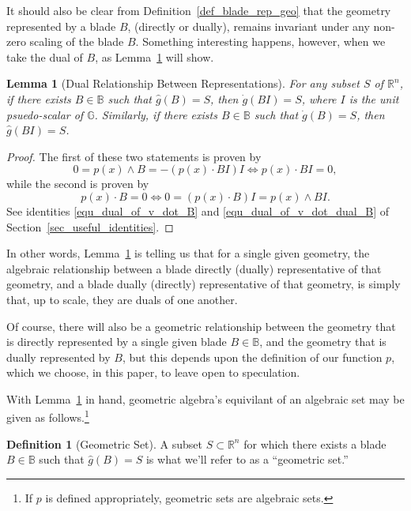 \documentclass{birkjour}
\newtheorem{lem}[thm]{Lemma}
\theoremstyle{definition}
\newtheorem{defn}[thm]{Definition}
\theoremstyle{remark}
\numberwithin{equation}{section}
\newcommand{\R}{\mathbb{R}}
\newcommand{\B}{\mathbb{B}}
\newcommand{\G}{\mathbb{G}}
\newcommand{\gd}{\dot{g}}
\newcommand{\gh}{\hat{g}}
\begin{document}
It should also be clear from Definition~\ref{def_blade_rep_geo} that the geometry represented by a blade $B$, (directly or dually), remains invariant
under any non-zero scaling of the blade $B$.  Something interesting happens, however, when we take the dual of $B$, as Lemma~\ref{lem_dual_rep} will show.

\begin{lem}[Dual Relationship Between Representations]\label{lem_dual_rep}
For any subset $S$ of $\R^n$, if there exists $B\in\B$ such that $\gh(B)=S$, then $\gd(BI)=S$, where
$I$ is the unit psuedo-scalar of $\G$.  Similarly, if there exists $B\in\B$ such that $\gd(B)=S$, then $\gh(BI)=S$.
\end{lem}
\begin{proof}
The first of these two statements is proven by
\begin{equation*}
0=p(x)\wedge B=-(p(x)\cdot BI)I\iff p(x)\cdot BI=0,
\end{equation*}
while the second is proven by
\begin{equation*}
p(x)\cdot B=0\iff 0=(p(x)\cdot B)I=p(x)\wedge BI.
\end{equation*}
See identities \eqref{equ_dual_of_v_dot_B} and \eqref{equ_dual_of_v_dot_dual_B} of Section~\ref{sec_useful_identities}.
\end{proof}

In other words, Lemma~\ref{lem_dual_rep} is telling us that for a single given geometry, the algebraic relationship between a
blade directly (dually) representative of that geometry, and a blade dually (directly) representative of that geometry, is simply
that, up to scale, they are duals of one another.

Of course, there will also be a geometric relationship between the geometry that is directly represented by a single given
blade $B\in\B$, and the geometry that is dually represented by $B$, but this depends upon the definition of our function
$p$, which we choose, in this paper, to leave open to speculation.

With Lemma~\ref{lem_dual_rep} in hand, geometric algebra's equivilant of an algebraic set may be given as follows.\footnote{If $p$ is
defined appropriately, geometric sets are algebraic sets.}

\begin{defn}[Geometric Set]\label{def_geo_set}
A subset $S\subset\R^n$ for which there exists a blade $B\in\B$ such that $\gh(B)=S$ is what we'll refer to as a ``geometric set.''
\end{defn}
\end{document}
